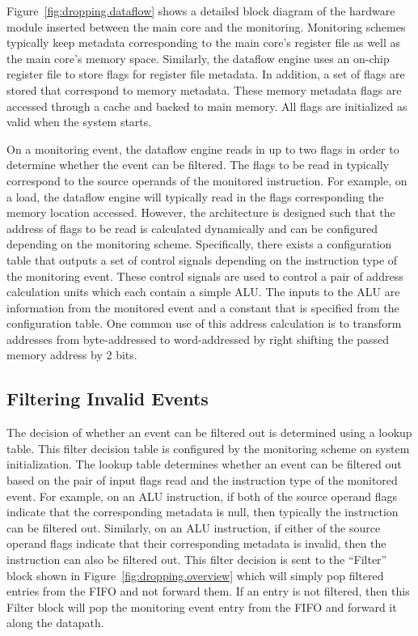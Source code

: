 Figure~\ref{fig:dropping.dataflow} shows a detailed block diagram of the
hardware module inserted between the main core and the monitoring. 
Monitoring schemes typically keep metadata corresponding to the main core's
register file as well as the main core's memory space. Similarly, the dataflow
engine uses an on-chip register file to store flags for register file metadata.
In addition, a set of flags are stored that correspond to memory metadata.
These memory metadata flags are accessed through a cache and backed to main
memory. All flags are initialized as valid when the system starts. 

On a monitoring event, the dataflow engine reads in up to two flags in order to
determine whether the event can be filtered.  The flags to be read in typically correspond to the source
operands of the monitored instruction. For example, on a load, the dataflow
engine will typically read in the flags corresponding the memory location
accessed.
However, the architecture is designed such that the address of flags to be read
is calculated dynamically and can be configured depending on the monitoring
scheme. Specifically, there exists a configuration table that outputs a set of
control signals depending on the instruction type of the monitoring event.
These control signals are used to control a pair of address calculation units which each
contain a simple ALU. The inputs to the ALU are information from the monitored
event and a constant that is specified from the configuration table. One common
use of this address calculation is to transform addresses from byte-addressed
to word-addressed by right shifting the passed memory address by 2 bits.

\subsection{Filtering Invalid Events}
\label{sec:dropping.filter}

The decision of whether an event can be filtered out is determined using a
lookup table. This filter decision table is configured by the monitoring scheme
on system initialization. The lookup table determines whether an event can be
filtered out based on the pair of input flags read and the instruction type of
the monitored event.
For example, on an ALU instruction, if both of the source operand flags
indicate that the corresponding metadata is null, then typically the instruction can be
filtered out. Similarly, on an ALU instruction, if either of the source operand
flags indicate that their corresponding metadata is invalid, then the
instruction can also be filtered out. This filter decision is sent to the
``Filter'' block shown in Figure~\ref{fig:dropping.overview} which will simply pop
filtered entries from the FIFO and not forward them. If an entry is not
filtered, then this Filter block will pop the monitoring event entry from the
FIFO and forward it along the datapath.

